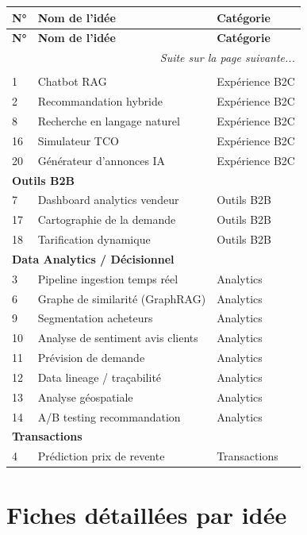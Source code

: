 \documentclass[11pt,a4paper]{article}
\begin{document}
\begin{longtable}{p{1.5cm} p{10cm} p{4.5cm}}
\toprule
\textbf{N°} & \textbf{Nom de l'idée} & \textbf{Catégorie} \\
\midrule
\endfirsthead
\toprule
\textbf{N°} & \textbf{Nom de l'idée} & \textbf{Catégorie} \\
\midrule
\endhead
\midrule
\multicolumn{3}{r}{\textit{Suite sur la page suivante...}} \\
\endfoot
\bottomrule
\endlastfoot

\multicolumn{3}{l}{\textbf{Expérience B2C}} \\
1 & Chatbot RAG & Expérience B2C \\
2 & Recommandation hybride & Expérience B2C \\
8 & Recherche en langage naturel & Expérience B2C \\
16 & Simulateur TCO & Expérience B2C \\
20 & Générateur d'annonces IA & Expérience B2C \\
\midrule
\multicolumn{3}{l}{\textbf{Outils B2B}} \\
7 & Dashboard analytics vendeur & Outils B2B \\
17 & Cartographie de la demande & Outils B2B \\
18 & Tarification dynamique & Outils B2B \\
\midrule
\multicolumn{3}{l}{\textbf{Data Analytics / Décisionnel}} \\
3 & Pipeline ingestion temps réel & Analytics \\
6 & Graphe de similarité (GraphRAG) & Analytics \\
9 & Segmentation acheteurs & Analytics \\
10 & Analyse de sentiment avis clients & Analytics \\
11 & Prévision de demande & Analytics \\
12 & Data lineage / traçabilité & Analytics \\
13 & Analyse géospatiale & Analytics \\
14 & A/B testing recommandation & Analytics \\
\midrule
\multicolumn{3}{l}{\textbf{Transactions}} \\
4 & Prédiction prix de revente & Transactions \\
\midrule

\end{longtable}

\newpage
\section{Fiches détaillées par idée}
\end{document}
